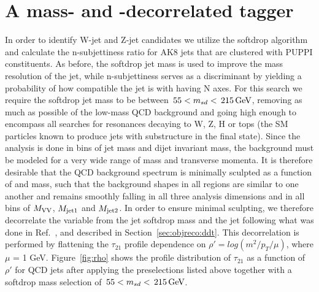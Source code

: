 \section{A mass- and \PT-decorrelated tagger}
\label{sec:searchIII:ddt}
In order to identify W-jet and Z-jet candidates we utilize the softdrop algorithm and calculate the n-subjettiness ratio \nsubj for AK8 jets that are clustered with PUPPI constituents. As before, the softdrop jet mass is used to improve the mass resolution of the jet, while n-subjettiness serves as a discriminant by yielding a probability of how compatible the jet is with having N axes. For this search we require the softdrop jet mass to be between $\text{\,55} < m_{sd} < \text{\,215}{\ensuremath{\,\text{Ge\hspace{-.08em}V}}}$, removing as much as possible of the low-mass QCD background and going high enough to encompass all searches for resonances decaying to W, Z, H or tops (the SM particles known to produce jets with substructure in the final state). Since the analysis is done in bins of jet mass and dijet invariant mass, the background must be modeled for a very wide range of mass and transverse momenta. It is therefore desirable that the QCD background spectrum is minimally sculpted as a function of \PT and mass, such that the background shapes in all regions are similar to one another and remains smoothly falling in all three analysis dimensions and in all bins of $M_{\rm VV}$, $M_{\rm jet1}$ and $M_{\rm jet2}$. In order to ensure minimal sculpting, we therefore decorrelate the \nsubj variable from the jet softdrop mass and the jet \PT following what was done in Ref.~\cite{Dolen:2016kst}, and described in Section~\ref{sec:objreco:ddt}. This decorrelation is performed by flattening the $\tau_{21}$ profile dependence on $\rho'= log(m^2/p_T/\mu)$, where $\mu$ = 1 GeV. Figure~\ref{fig:rho} shows the profile distribution of $\tau_{21}$ as a function of $\rho'$ for QCD jets after applying the preselections listed above together with a softdrop mass selection of $\text{\,55} < m_{sd} < \text{\,215}{\ensuremath{\,\text{Ge\hspace{-.08em}V}}}$.
